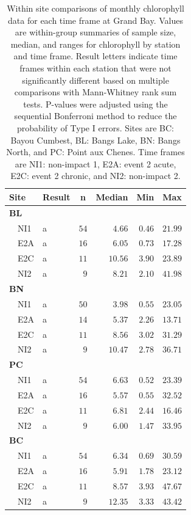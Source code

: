\documentclass[letterpaper,12pt]{article}\usepackage[]{graphicx}\usepackage[]{color}
\begin{document}
\clearpage

\begin{table}[!tbp]
\caption{Within site comparisons  of monthly chlorophyll data for each time frame at Grand Bay.  Values are within-group summaries of sample size, median, and ranges for chlorophyll by station and time frame.  Result letters indicate time frames within each station that were not significantly different based on multiple comparisons with Mann-Whitney rank sum tests.  P-values were adjusted using the sequential Bonferroni method to reduce the probability of Type I errors. Sites are BC: Bayou Cumbest, BL: Bangs Lake, BN: Bangs North, and PC: Point aux Chenes.  Time frames are NI1: non-impact 1, E2A: event 2 acute, E2C: event 2 chronic, and NI2: non-impact 2.\label{tab:chltab}} 
\begin{center}
\begin{tabular}{llrrrr}
\hline\hline
\multicolumn{1}{l}{Site}&\multicolumn{1}{c}{Result}&\multicolumn{1}{c}{n}&\multicolumn{1}{c}{Median}&\multicolumn{1}{c}{Min}&\multicolumn{1}{c}{Max}\tabularnewline
\hline
{\bfseries BL}&&&&&\tabularnewline
~~NI1&a&$54$&$ 4.66$&$0.46$&$21.99$\tabularnewline
~~E2A&a&$16$&$ 6.05$&$0.73$&$17.28$\tabularnewline
~~E2C&a&$11$&$10.56$&$3.90$&$23.89$\tabularnewline
~~NI2&a&$ 9$&$ 8.21$&$2.10$&$41.98$\tabularnewline
\hline
{\bfseries BN}&&&&&\tabularnewline
~~NI1&a&$50$&$ 3.98$&$0.55$&$23.05$\tabularnewline
~~E2A&a&$14$&$ 5.37$&$2.26$&$13.71$\tabularnewline
~~E2C&a&$11$&$ 8.56$&$3.02$&$31.29$\tabularnewline
~~NI2&a&$ 9$&$10.47$&$2.78$&$36.71$\tabularnewline
\hline
{\bfseries PC}&&&&&\tabularnewline
~~NI1&a&$54$&$ 6.63$&$0.52$&$23.39$\tabularnewline
~~E2A&a&$16$&$ 5.57$&$0.55$&$32.52$\tabularnewline
~~E2C&a&$11$&$ 6.81$&$2.44$&$16.46$\tabularnewline
~~NI2&a&$ 9$&$ 6.00$&$1.47$&$33.95$\tabularnewline
\hline
{\bfseries BC}&&&&&\tabularnewline
~~NI1&a&$54$&$ 6.34$&$0.69$&$30.59$\tabularnewline
~~E2A&a&$16$&$ 5.91$&$1.78$&$23.12$\tabularnewline
~~E2C&a&$11$&$ 8.57$&$3.93$&$47.67$\tabularnewline
~~NI2&a&$ 9$&$12.35$&$3.33$&$43.42$\tabularnewline
\hline
\end{tabular}\end{center}

\end{table}

\clearpage
\end{document}
